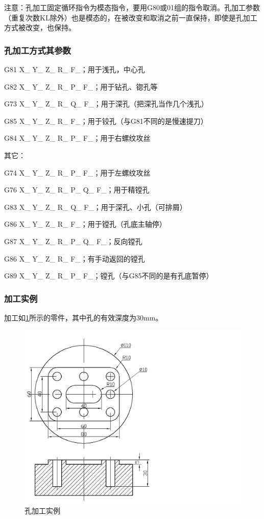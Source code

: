 注意：孔加工固定循环指令为模态指令，要用G80或01组的指令取消。孔加工参数（重复次数KL除外）也是模态的，在被改变和取消之前一直保持，即使是孔加工方式被改变，也保持。



\subsubsection{孔加工方式其参数}
G81 X\_ Y\_ Z\_ R\_ F\_；用于浅孔，中心孔

G82 X\_ Y\_ Z\_ R\_ P\_ F\_；用于钻孔、锪孔等 

G73 X\_ Y\_ Z\_ R\_ Q\_ F\_；用于深孔（把深孔当作几个浅孔）

G85 X\_ Y\_ Z\_ R\_ F\_；用于铰孔（与G81不同的是慢速提刀）

G84 X\_ Y\_ Z\_ R\_ P\_ F\_；用于右螺纹攻丝

其它：

G74 X\_ Y\_ Z\_ R\_ P\_ F\_；用于左螺纹攻丝

G76 X\_ Y\_ Z\_ R\_ P\_ Q\_ F\_；用于精镗孔

G83 X\_ Y\_ Z\_ R\_ Q\_ F\_；用于深孔、小孔（可排屑）

G86 X\_ Y\_ Z\_ R\_ F\_；用于镗孔（孔底主轴停）

G87 X\_ Y\_ Z\_ R\_ P\_ Q\_ F\_；反向镗孔

G86 X\_ Y\_ Z\_ R\_ F\_；有手动返回的镗孔

G89 X\_ Y\_ Z\_ R\_ P\_ F\_；镗孔（与G85不同的是有孔底暂停）


\subsubsection{加工实例}

加工如\ref{fig:21-2}所示的零件，其中孔的有效深度为30mm。

\begin{figure}
	\centering
	\includegraphics[width=0.5\linewidth,trim=0 0 450  0,clip]{data/image/21-2}
	\caption{孔加工实例}
	\label{fig:21-2}
\end{figure}

